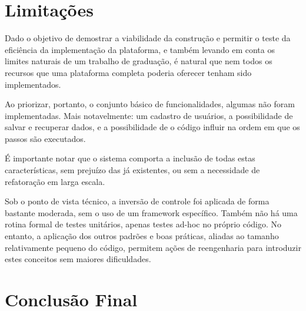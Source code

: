 \documentclass{abnt}
\begin{document}




\section {Limitações}

Dado o objetivo de demostrar a viabilidade da construção e permitir o teste da eficiência da implementação da plataforma, e também levando em conta os limites naturais de um trabalho de graduação, é natural que nem todos os recursos que uma plataforma completa poderia oferecer tenham sido implementados.

Ao priorizar, portanto, o conjunto básico de funcionalidades, algumas não foram implementadas. Mais notavelmente: um cadastro de usuários, a possibilidade de salvar e recuperar dados, e a possibilidade de o código influir na ordem em que os passos são executados.

É importante notar que o sistema comporta a inclusão de todas estas características, sem prejuízo das já existentes, ou sem a necessidade de refatoração em larga escala.

Sob o ponto de vista técnico, a inversão de controle foi aplicada de forma bastante moderada, sem o uso de um framework específico. Também não há uma rotina formal de testes unitários, apenas testes ad-hoc no próprio código. No entanto, a aplicação dos outros padrões e boas práticas, aliadas ao tamanho relativamente pequeno do código, permitem ações de reengenharia para introduzir estes conceitos sem maiores dificuldades.

\section {Conclusão Final}
\end{document}
